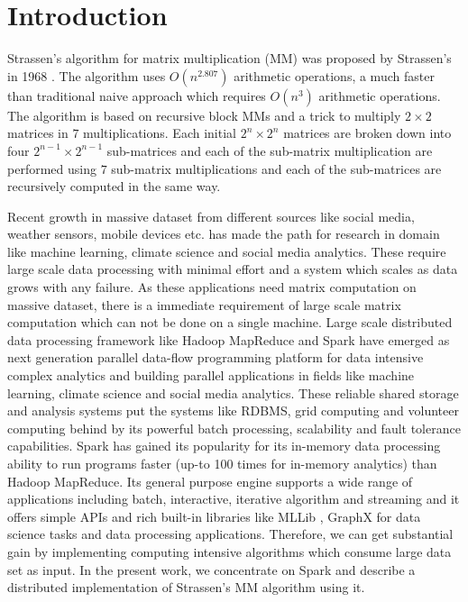 
\section{Introduction}
Strassen's algorithm for matrix multiplication (MM) was proposed by Strassen's in 1968 \cite{strassen1969gaussian}. The algorithm uses $O(n^{2.807})$ arithmetic operations, a much faster than traditional naive approach which requires $O(n^{3})$ arithmetic operations. The algorithm is based on recursive block MMs and a trick to multiply $2\times 2$ matrices in $7$ multiplications. Each initial $2^{n}\times 2^{n}$ matrices are broken down into four $2^{n-1}\times 2^{n-1}$ sub-matrices and each of the sub-matrix multiplication are performed using $7$ sub-matrix multiplications and each of the sub-matrices are recursively computed in the same way.

Recent growth in massive dataset from different sources like social media, weather sensors, mobile devices etc. has made the path for research in domain like machine learning, climate science and social media analytics. These require large scale data processing with minimal effort and a system which scales as data grows with any failure. As these applications need matrix computation on massive dataset, there is a immediate requirement of large scale matrix computation which can not be done on a single machine.
Large scale distributed data processing framework like Hadoop MapReduce \cite{hadoop} and Spark \cite{spark} have emerged as next generation parallel data-flow programming platform for data intensive complex analytics and building parallel applications in fields like machine learning, climate science and social media analytics. These reliable shared storage and analysis systems put the systems like RDBMS, grid computing and volunteer computing behind by its powerful batch processing, scalability and fault tolerance capabilities. Spark has gained its popularity for its in-memory data processing ability to run programs faster (up-to 100 times for in-memory analytics) than Hadoop MapReduce. Its general purpose engine supports a wide range of applications including batch, interactive, iterative algorithm and streaming and it offers simple APIs and rich built-in libraries like MLLib \cite{meng2016mllib}, GraphX \cite{xin2013graphx} for data science tasks and data processing applications. Therefore, we can get substantial gain by implementing computing intensive algorithms which consume large data set as input. In the present work, we concentrate on Spark and describe a distributed implementation of Strassen's MM algorithm using it.

